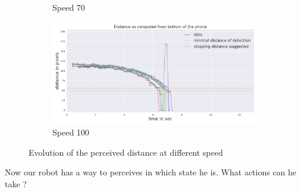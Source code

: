\documentclass[14pt,a4paper]{article}
\theoremstyle{definition}
\begin{document}
\begin{figure}[h]
\begin{subfigure}[b]{0.475\textwidth}
            \caption[]%
            {{\small Speed 70}}    
            \label{fig:mean and std of net34}
        \end{subfigure}
        \quad
        \begin{subfigure}[b]{0.475\textwidth}   
            \centering 
            \includegraphics[width=\textwidth]{img/dist100.png}
            \caption[]%
            {{\small Speed 100}}    
            \label{fig:mean and std of net44}
        \end{subfigure}
        \caption{{\small Evolution of the perceived distance at different speed}}
	\label{distance_plots}
\end{figure}


Now our robot has a way to perceives in which state he is. What actions can he take ? 
\end{document}
